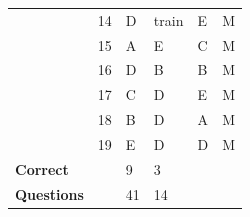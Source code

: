 \documentclass[pageno]{final_paper}
\begin{document}
\begin{table}[]
\begin{tabular}{@{}llllll@{}}
\textbf{}               & 14                                  & D                                          & train                                       & E                                           & M                                       \\
\textbf{}               & 15                                  & A                                          & E                                           & C                                           & M                                       \\
\textbf{}               & 16                                  & D                                          & B                                           & B                                           & M                                       \\
\textbf{}               & 17                                  & C                                          & D                                           & E                                           & M                                       \\
\textbf{}               & 18                                  & B                                          & D                                           & A                                           & M                                       \\
\textbf{}               & 19                                  & E                                          & D                                           & D                                           & M                                       \\ \midrule
\textbf{Correct}        &                                     & 9                                          & 3                                           &                                             &                                         \\
\textbf{Questions}      &                                     & 41                                         & 14                                          &                                             &                                         \\ \bottomrule
\end{tabular}
\end{table}
\end{document}
